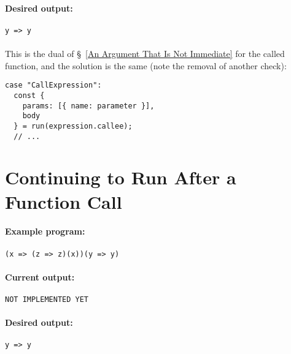 \documentclass[12pt, oneside]{book}
\begin{document}
\paragraph{Desired output:}

\begin{verbatim}
y => y
\end{verbatim}

\paragraph{}

This is the dual of §~\ref{An Argument That Is Not Immediate} for the called function, and the solution is the same (note the removal of another check):

\begin{verbatim}
case "CallExpression":
  const {
    params: [{ name: parameter }],
    body
  } = run(expression.callee);
  // ...
\end{verbatim}

\section{Continuing to Run After a Function Call}

\paragraph{Example program:}

\begin{verbatim}
(x => (z => z)(x))(y => y)
\end{verbatim}

\paragraph{Current output:}

\begin{verbatim}
NOT IMPLEMENTED YET
\end{verbatim}

\paragraph{Desired output:}

\begin{verbatim}
y => y
\end{verbatim}

\paragraph{}
\end{document}
